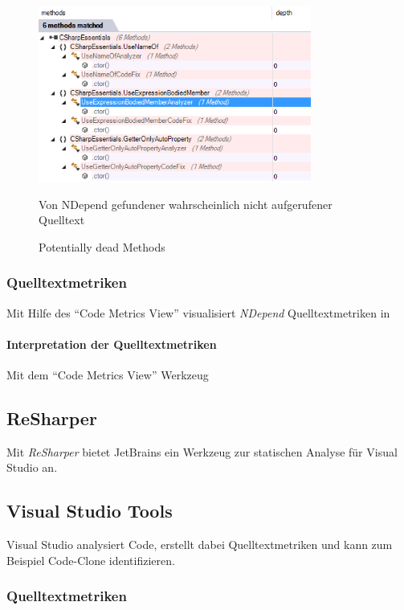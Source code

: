 \begin{figure}[ht]
\centering
\includegraphics[width=0.8\textwidth]{images/dead-methods.png}
\caption{Potentially dead Methods}
\vspace{0.1cm}
Von NDepend gefundener wahrscheinlich nicht aufgerufener Quelltext
\label{fig:dead-methods}
\end{figure}

\subsubsection{Quelltextmetriken}
Mit Hilfe des \enquote{Code Metrics View} visualisiert \emph{NDepend} Quelltextmetriken in

\paragraph{Interpretation der Quelltextmetriken}
Mit dem \enquote{Code Metrics View} Werkzeug

\subsection{ReSharper}
Mit \emph{ReSharper} bietet JetBrains ein Werkzeug zur statischen Analyse für Visual Studio an.~\cite{resharper} 

\subsection{Visual Studio Tools}
Visual Studio analysiert Code, erstellt dabei Quelltextmetriken und kann zum Beispiel Code-Clone identifizieren.

\subsubsection{Quelltextmetriken}

